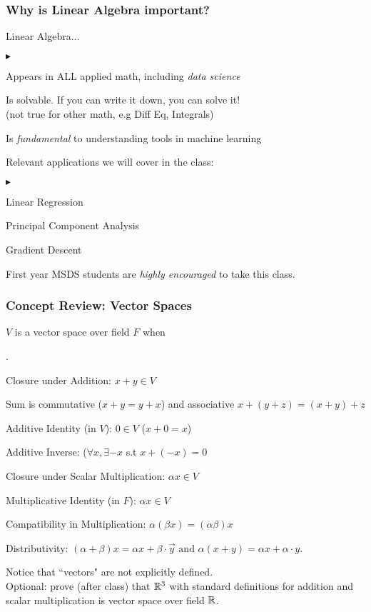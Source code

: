 \documentclass{beamer}
\renewenvironment{itemize}
\newcommand\fonteight{\fontsize{8}{9.6}\selectfont}
\renewenvironment{enumerate}%
{\begin{list}{\arabic{enumi}.}%
      {\setlength{\leftmargin}{2.5em}%
       \setlength{\itemsep}{-\parsep}%
       \setlength{\topsep}{-\parskip}%
       \usecounter{enumi}}%
 }{\end{list}}
\renewenvironment{itemize}%
{\begin{list}{$\blacktriangleright$}%
      {\setlength{\leftmargin}{2.5em}%
       \setlength{\itemsep}{-\parsep}%
       \setlength{\topsep}{-\parskip}%
       \usecounter{enumi}}%
 }{\end{list}}
\begin{document}
\begin{frame}
\frametitle{Why is Linear Algebra important?}
Linear Algebra...
\begin{itemize}
\item Appears in ALL applied math, including \textit{data science}
\item Is solvable. If you can write it down, you can solve it! \\
    \qquad (not true for other math, e.g Diff Eq, Integrals)
\item Is \textit{fundamental} to understanding tools in machine learning
\end{itemize}

Relevant applications we will cover in the class:
\begin{itemize}
\item Linear Regression
\item Principal Component Analysis
\item Gradient Descent
\end{itemize}

First year MSDS students are \textit{highly encouraged} to take this class.
\end{frame}
\begin{frame}
\frametitle{Concept Review: Vector Spaces}

\begin{definition}
	    $V$ is a vector space over field $F$ when
	    \fonteight
		\begin{enumerate}
		\item[1.] Closure under Addition: $x+y \in V$
		\item[2.] Sum is commutative ($x+y = y+x$) and associative $x+(y+z)= (x+y)+z$
		\item[3.] Additive Identity (in $V$): $0\in V$ ($x+0 =x$)
		\item[4.] Additive Inverse: ($\forall x, \exists -x $ s.t $ x+(-x)=0$
		\item[5.] Closure under Scalar Multiplication: $\alpha x \in V$
		\item[6.] Multiplicative Identity (in $F$): $\alpha x \in V$
		\item[7.] Compatibility in Multiplication: $\alpha (\beta x) = (\alpha \beta) x $
		\item[8.] Distributivity: $(\alpha + \beta) x = \alpha x + \beta \cdot \vec{y}
			 \text{ and }
			\alpha  (x + y) = \alpha  x + \alpha \cdot y.$
		\end{enumerate}
\end{definition}
Notice that ``vectors" are not explicitly defined. \\
Optional: prove (after class) that $\mathbb{R}^3$ with standard definitions for addition and scalar multiplication
 is vector space over field $\mathbb{R}$.
\end{frame}
\end{document}
